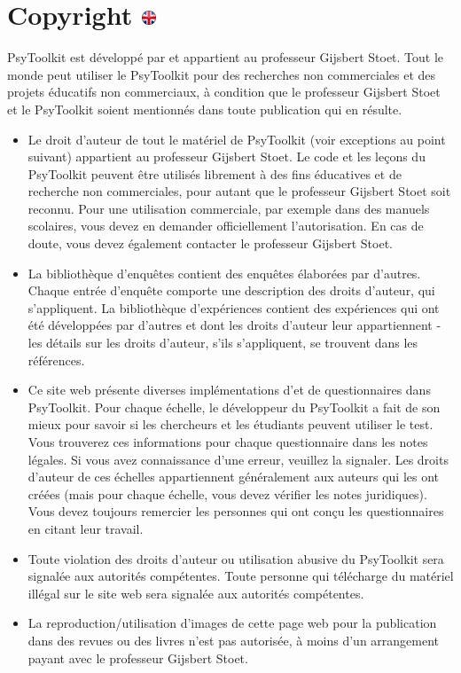 \documentclass[
]{book}
\providecommand{\tightlist}{%
  \setlength{\itemsep}{0pt}\setlength{\parskip}{0pt}}
\begin{document}
\hypertarget{copyright}{%
\section[Copyright ]{\texorpdfstring{Copyright
\href{https://www.psytoolkit.org/copyright.html}{\protect\includegraphics{img/ukflag.png}}}{Copyright }}\label{copyright}}

PsyToolkit est développé par et appartient au professeur Gijsbert Stoet.
Tout le monde peut utiliser le PsyToolkit pour des recherches non
commerciales et des projets éducatifs non commerciaux, à condition que
le professeur Gijsbert Stoet et le PsyToolkit soient mentionnés dans
toute publication qui en résulte.

\begin{itemize}
\tightlist
\item
  Le droit d'auteur de tout le matériel de PsyToolkit (voir exceptions
  au point suivant) appartient au professeur Gijsbert Stoet. Le code et
  les leçons du PsyToolkit peuvent être utilisés librement à des fins
  éducatives et de recherche non commerciales, pour autant que le
  professeur Gijsbert Stoet soit reconnu. Pour une utilisation
  commerciale, par exemple dans des manuels scolaires, vous devez en
  demander officiellement l'autorisation. En cas de doute, vous devez
  également contacter le professeur Gijsbert Stoet.
\item
  La bibliothèque d'enquêtes contient des enquêtes élaborées par
  d'autres. Chaque entrée d'enquête comporte une description des droits
  d'auteur, qui s'appliquent. La bibliothèque d'expériences contient des
  expériences qui ont été développées par d'autres et dont les droits
  d'auteur leur appartiennent - les détails sur les droits d'auteur,
  s'ils s'appliquent, se trouvent dans les références.
\item
  Ce site web présente diverses implémentations d'et de questionnaires
  dans PsyToolkit. Pour chaque échelle, le développeur du PsyToolkit a
  fait de son mieux pour savoir si les chercheurs et les étudiants
  peuvent utiliser le test. Vous trouverez ces informations pour chaque
  questionnaire dans les notes légales. Si vous avez connaissance d'une
  erreur, veuillez la signaler. Les droits d'auteur de ces échelles
  appartiennent généralement aux auteurs qui les ont créées (mais pour
  chaque échelle, vous devez vérifier les notes juridiques). Vous devez
  toujours remercier les personnes qui ont conçu les questionnaires en
  citant leur travail.
\item
  Toute violation des droits d'auteur ou utilisation abusive du
  PsyToolkit sera signalée aux autorités compétentes. Toute personne qui
  télécharge du matériel illégal sur le site web sera signalée aux
  autorités compétentes.
\item
  La reproduction/utilisation d'images de cette page web pour la
  publication dans des revues ou des livres n'est pas autorisée, à moins
  d'un arrangement payant avec le professeur Gijsbert Stoet.
\end{itemize}
\end{document}
